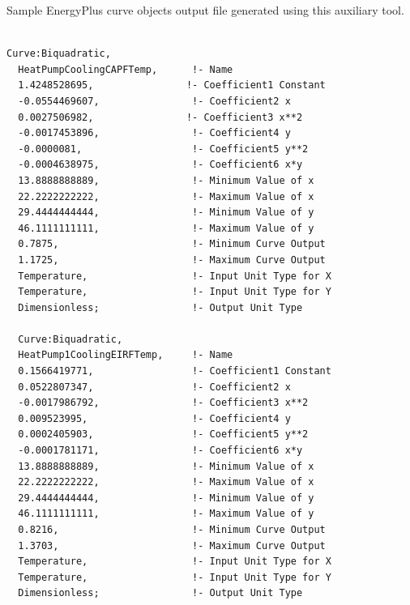 Sample EnergyPlus curve objects output file generated using this auxiliary tool.

\begin{lstlisting}

Curve:Biquadratic,
  HeatPumpCoolingCAPFTemp,      !- Name
  1.4248528695,                !- Coefficient1 Constant
  -0.0554469607,                !- Coefficient2 x
  0.0027506982,                !- Coefficient3 x**2
  -0.0017453896,                !- Coefficient4 y
  -0.0000081,                   !- Coefficient5 y**2
  -0.0004638975,                !- Coefficient6 x*y
  13.8888888889,                !- Minimum Value of x
  22.2222222222,                !- Maximum Value of x
  29.4444444444,                !- Minimum Value of y
  46.1111111111,                !- Maximum Value of y
  0.7875,                       !- Minimum Curve Output
  1.1725,                       !- Maximum Curve Output
  Temperature,                  !- Input Unit Type for X
  Temperature,                  !- Input Unit Type for Y
  Dimensionless;                !- Output Unit Type

  Curve:Biquadratic,
  HeatPump1CoolingEIRFTemp,     !- Name
  0.1566419771,                 !- Coefficient1 Constant
  0.0522807347,                 !- Coefficient2 x
  -0.0017986792,                !- Coefficient3 x**2
  0.009523995,                  !- Coefficient4 y
  0.0002405903,                 !- Coefficient5 y**2
  -0.0001781171,                !- Coefficient6 x*y
  13.8888888889,                !- Minimum Value of x
  22.2222222222,                !- Maximum Value of x
  29.4444444444,                !- Minimum Value of y
  46.1111111111,                !- Maximum Value of y
  0.8216,                       !- Minimum Curve Output
  1.3703,                       !- Maximum Curve Output
  Temperature,                  !- Input Unit Type for X
  Temperature,                  !- Input Unit Type for Y
  Dimensionless;                !- Output Unit Type
\end{lstlisting}
